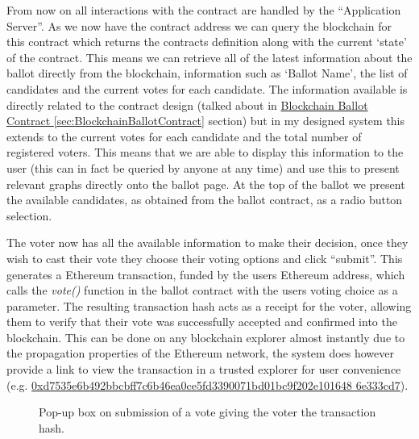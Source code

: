 \documentclass{article}
\begin{document}
From now on all interactions with the contract are handled by the ``Application Server''. As we now have the contract address we can query the blockchain for this contract which returns the contracts definition along with the current `state' of the contract. This means we can retrieve all of the latest information about the ballot directly from the blockchain, information such as `Ballot Name', the list of candidates and the current votes for each candidate. The information available is directly related to the contract design (talked about in \hyperref[sec:BlockchainBallotContract]{Blockchain Ballot Contract \ref*{sec:BlockchainBallotContract}} section) but in my designed system this extends to the current votes for each candidate and the total number of registered voters. This means that we are able to display this information to the user (this can in fact be queried by anyone at any time) and use this to present relevant graphs directly onto the ballot page. At the top of the ballot we present the available candidates, as obtained from the ballot contract, as a radio button selection.

The voter now has all the available information to make their decision, once they wish to cast their vote they choose their voting options and click ``submit''. This generates a Ethereum transaction, funded by the users Ethereum address, which calls the \textit{vote()} function in the ballot contract with the users voting choice as a parameter. The resulting transaction hash acts as a receipt for the voter, allowing them to verify that their vote was successfully accepted and confirmed into the blockchain. This can be done on any blockchain explorer almost instantly due to the propagation properties of the Ethereum network, the system does however provide a link to view the transaction in a trusted explorer for user convenience (e.g. \href{https://etherscan.io/tx/0xd7535e6b492bbcbff7c6b46ea0ce5fd3390071bd01bc9f202e1016486e333cd7}{0xd7535e6b492bbcbff7c6b46ea0ce5fd3390071bd01bc9f202e101648
6e333cd7}).

\begin{figure}[h]
	\noindent
	\caption{Pop-up box on submission of a vote giving the voter the transaction hash.}
\end{figure}
\end{document}
